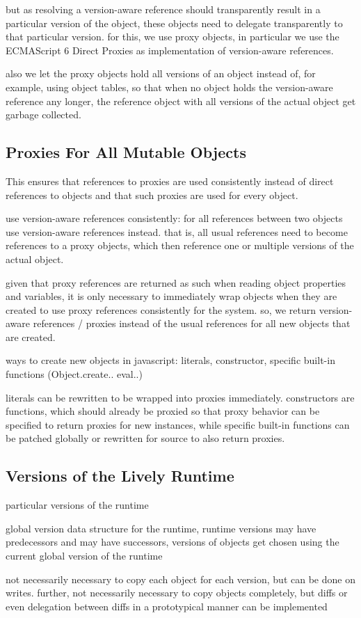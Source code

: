 but as resolving a version-aware reference should transparently result in a particular version of the object, these objects need to delegate transparently to that particular version.
for this, we use proxy objects, in particular we use the ECMAScript 6 Direct Proxies as implementation of version-aware references.

also we let the proxy objects hold all versions of an object instead of, for example, using object tables, so that when no object holds the version-aware reference any longer, the reference object with all versions of the actual object get garbage collected.



\subsection{Proxies For All Mutable Objects}

This ensures that references to proxies are used consistently instead of direct references to objects and that such proxies are used for every object.


use version-aware references consistently:
for all references between two objects use version-aware references instead. that is, all usual references need to become references to a proxy objects, which then reference one or multiple versions of the actual object.

given that proxy references are returned as such when reading object properties and variables, it is only necessary to immediately wrap objects when they are created to use proxy references consistently for the system. so, we return version-aware references / proxies instead of the usual references for all new objects that are created.

ways to create new objects in javascript: literals, constructor, specific built-in functions (Object.create.. eval..)

literals can be rewritten to be wrapped into proxies immediately. constructors are functions, which should already be proxied so that proxy behavior can be specified to return proxies for new instances, while specific built-in functions can be patched globally or rewritten for source to also return proxies.



\subsection{Versions of the Lively Runtime}

particular versions of the runtime

global version data structure for the runtime, runtime versions may have predecessors and may have successors, versions of objects get chosen using the current global version of the runtime

not necessarily necessary to copy each object for each version, but can be done on writes. further, not necessarily necessary to copy objects completely, but diffs or even delegation between diffs in a prototypical manner can be implemented
